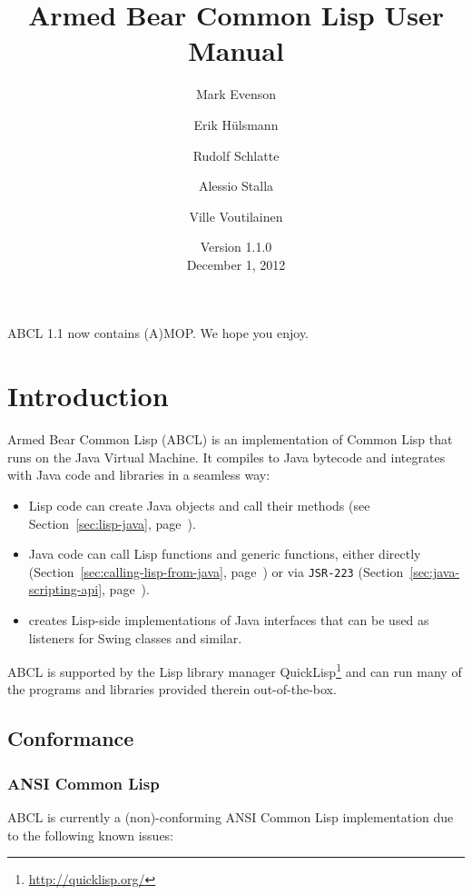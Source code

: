 \documentclass[10pt]{book}
\begin{document}
\title{Armed Bear Common Lisp User Manual}
\date{Version 1.1.0\\
\smallskip
December 1, 2012}
\author{Mark Evenson \and Erik H\"{u}lsmann \and Rudolf Schlatte \and
  Alessio Stalla \and Ville Voutilainen}

\maketitle

\tableofcontents


ABCL 1.1 now contains (A)MOP.  We hope you enjoy.

\chapter{Introduction}

Armed Bear Common Lisp (ABCL) is an implementation of Common Lisp that
runs on the Java Virtual Machine.  It compiles to Java bytecode and
integrates with Java code and libraries in a seamless way:
\begin{itemize}
\item Lisp code can create Java objects and call their methods (see
  Section~\ref{sec:lisp-java}, page~\pageref{sec:lisp-java}).
\item Java code can call Lisp functions and generic functions, either
  directly (Section~\ref{sec:calling-lisp-from-java},
  page~\pageref{sec:calling-lisp-from-java}) or via \texttt{JSR-223}
  (Section~\ref{sec:java-scripting-api},
  page~\pageref{sec:java-scripting-api}).
\item {} creates Lisp-side implementations
  of Java interfaces that can be used as listeners for Swing classes and
  similar.
\end{itemize}
ABCL is supported by the Lisp library manager
QuickLisp\footnote{\url{http://quicklisp.org/}} and can run many of the
programs and libraries provided therein out-of-the-box.

\section{Conformance}
\label{section:conformance}

\subsection{ANSI Common Lisp}
\textsc{ABCL} is currently a (non)-conforming ANSI Common Lisp
implementation due to the following known issues:
\end{document}
